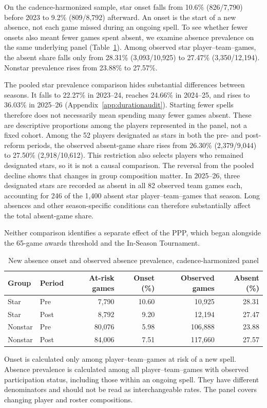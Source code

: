 \documentclass[11pt]{article}
\begin{document}
On the cadence-harmonized sample, star onset falls from 10.6\% (826/7,790) before 2023 to 9.2\% (809/8,792) afterward. An onset is the start of a new absence, not each game missed during an ongoing spell. To see whether fewer onsets also meant fewer games spent absent, we examine absence prevalence on the same underlying panel (Table~\ref{tab:prevalence}). Among observed star player--team--games, the absent share falls only from 28.31\% (3,093/10,925) to 27.47\% (3,350/12,194). Nonstar prevalence rises from 23.88\% to 27.57\%.

The pooled star prevalence comparison hides substantial differences between seasons. It falls to 22.27\% in 2023--24, reaches 24.66\% in 2024--25, and rises to 36.03\% in 2025--26 (Appendix~\ref{app:durationaudit}). Starting fewer spells therefore does not necessarily mean spending many fewer games absent. These are descriptive proportions among the players represented in the panel, not a fixed cohort. Among the 52 players designated as stars in both the pre- and post-reform periods, the observed absent-game share rises from 26.30\% (2,379/9,044) to 27.50\% (2,918/10,612). This restriction also selects players who remained designated stars, so it is not a causal comparison. The reversal from the pooled decline shows that changes in group composition matter. In 2025--26, three designated stars are recorded as absent in all 82 observed team games each, accounting for 246 of the 1,400 absent star player--team--games that season. Long absences and other season-specific conditions can therefore substantially affect the total absent-game share.\par\smallskip Neither comparison identifies a separate effect of the PPP, which began alongside the 65-game awards threshold and the In-Season Tournament.

\begin{table}[!htbp]\centering
\caption{New absence onset and observed absence prevalence, cadence-harmonized panel}\label{tab:prevalence}
\small\setlength{\tabcolsep}{4.5pt}
\begin{tabular}{@{}llrrrr@{}}\toprule
Group & Period & At-risk games & Onset (\%) & Observed games & Absent (\%)\\\midrule
Star & Pre & 7,790 & 10.60 & 10,925 & 28.31\\
Star & Post & 8,792 & 9.20 & 12,194 & 27.47\\
Nonstar & Pre & 80,076 & 5.98 & 106,888 & 23.88\\
Nonstar & Post & 84,006 & 7.51 & 117,660 & 27.57\\\bottomrule
\end{tabular}\par\smallskip\raggedright\footnotesize
Onset is calculated only among player--team--games at risk of a new spell. Absence prevalence is calculated among all player--team--games with observed participation status, including those within an ongoing spell. They have different denominators and should not be read as interchangeable rates. The panel covers changing player and roster compositions.
\end{table}
\end{document}
